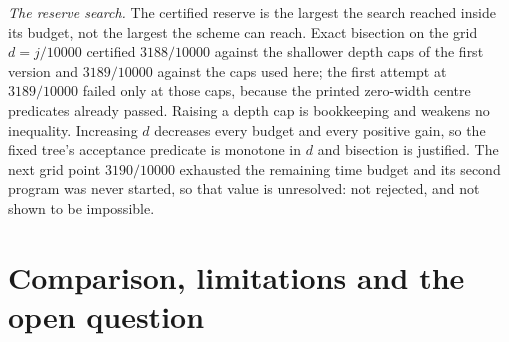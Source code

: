 \documentclass[10pt]{article}
\theoremstyle{remark}
\begin{document}
\emph{The reserve search.} The certified reserve is the largest the search reached inside its budget, not the largest the scheme can reach. Exact bisection on the grid $d=j/10000$ certified $3188/10000$ against the shallower depth caps of the first version and $3189/10000$ against the caps used here; the first attempt at $3189/10000$ failed only at those caps, because the printed zero-width centre predicates already passed. Raising a depth cap is bookkeeping and weakens no inequality. Increasing $d$ decreases every budget and every positive gain, so the fixed tree's acceptance predicate is monotone in $d$ and bisection is justified. The next grid point $3190/10000$ exhausted the remaining time budget and its second program was never started, so that value is unresolved: not rejected, and not shown to be impossible.

\section{Comparison, limitations and the open question}\label{sec:compare}
\end{document}

